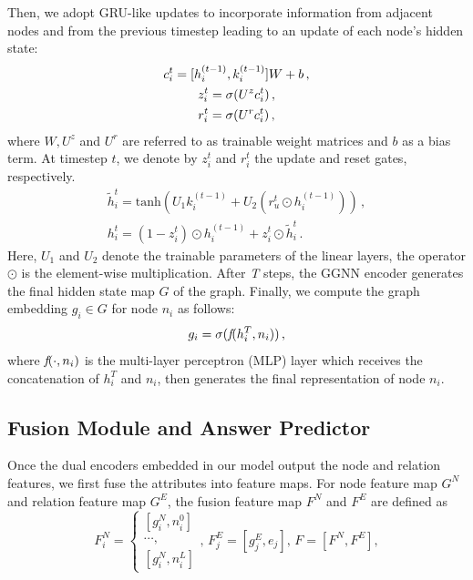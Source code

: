 \documentclass[letterpaper]{article} %
\begin{document}
Then, we adopt GRU-like updates to incorporate information from adjacent nodes and from the previous timestep leading to an update of each node's hidden state:
\begin{gather}\notag
    c_i^t = [h_i^{(t-1)}, k_{i}^{(t-1)}] W + b \, ,\\
    z_i^t = \sigma(U^z c_i^t) \, , \\\notag
    r_i^t = \sigma(U^r c_i^t)\, , \notag
\end{gather}
where $W, U^z$ and $U^r$ are referred to as trainable weight matrices and $b$ as a bias term.
At timestep $t$, we denote by $z_i^t$ and $r_i^t$ the update and reset gates, respectively.
\begin{gather}
    \tilde{h}_i^t = \text{tanh}(U_1 k_{i}^{(t-1)} + U_2(r_u^t \odot h_i^{(t-1)})) \, ,\\
    h_i^t = (1-z_i^t)\odot h_i^{(t-1)} + z_i^t\odot \tilde{h}_i^t \, .
\end{gather}
Here, $U_1$ and $U_2$ denote the trainable parameters of the linear layers, the operator $\odot$ is the element-wise multiplication.
After \emph{T} steps, the GGNN encoder generates the final hidden state map $G$ of the graph. 
Finally, we compute the graph embedding $g_i \in G$ for node ${n}_i$ as follows:
\begin{equation}
    g_i = \sigma( \emph{f}(h_i^T, n_i)) \, ,
\end{equation}
where $\emph{f}(\cdot, n_i)$ is the multi-layer perceptron (MLP) layer which receives the concatenation of $h_i^T$ and $n_i$, then generates the final representation of node ${n}_i$. 

\subsection{Fusion Module and Answer Predictor}

Once the dual encoders embedded in our model output the node and relation features, we first fuse the attributes into feature maps. For node feature map $G^N$ and relation feature map $G^E$, the fusion feature map $F^N$ and $F^E$ are defined as
{\small \begin{equation}
F_i^N= \begin{cases}
[g_i^N, n_i^0]  \\
\cdots, \\
[g_i^N, n_i^L]
\end{cases} 
,\, F_j^E = [g_j^E, e_j] , \,
    F = [F^N, F^E]  ,
\end{equation}
}
\end{document}
